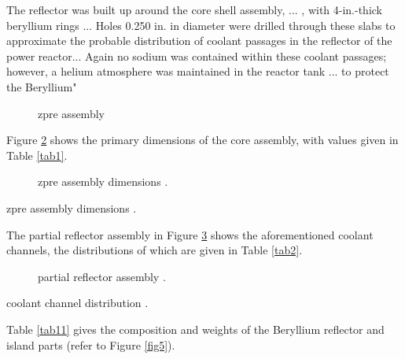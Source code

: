 \documentclass[ms,a4paper]{memoir}
\begin{document}
The reflector was built up around the core shell assembly, ... , with 4-in.-thick beryllium rings ... Holes 0.250 in. in diameter were drilled through these slabs to approximate the probable distribution of coolant passages in the reflector of the power reactor... Again no sodium was contained within these coolant passages; however, a helium atmosphere was maintained in the reactor tank ... to protect the Beryllium"

\begin{figure}[H]
  \centering
  \caption{zpre assembly \parencite[Figure 1]{ornl-2536}}
  \label{fig1}
\end{figure}

Figure \ref{fig2} shows the primary dimensions of the core assembly, with values given in Table \ref{tab1}.

\begin{figure}[H]
  \centering
  \caption{zpre assembly dimensions \parencite[Figure 8]{ornl-2536}.}
  \label{fig2}
\end{figure}

\begin{table}[H]
  \centering
  \caption{zpre assembly dimensions \parencite[Table 4]{ornl-2536}.}
  \label{tab1}
\end{table}

The partial reflector assembly in Figure \ref{fig3} shows the aforementioned coolant channels, the distributions of which are given in Table \ref{tab2}.

\begin{figure}[H]
  \centering
  \caption{partial reflector assembly \parencite[Figure 3]{ornl-2536}.}
  \label{fig3}
\end{figure}

\begin{table}[H]
  \centering
  \caption{coolant channel distribution \parencite[Table 3]{ornl-2536}.}
  \label{tab2}
\end{table}

Table \ref{tab11} gives the composition and weights of the Beryllium reflector and island parts (refer to Figure \ref{fig5}).
\end{document}
